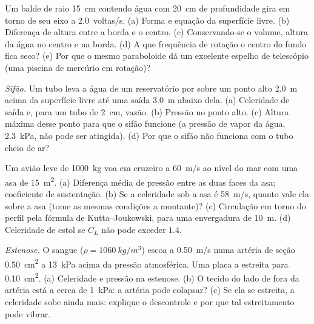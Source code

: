 \begin{exercise}[$\star\star$]\label{exo:b2:euler-bernoulli:6}
Um balde de raio \qty{15}{cm} contendo água com \qty{20}{cm} de profundidade gira
em torno de seu eixo a \qty{2.0}{voltas/s}. (a) Forma e equação da superfície
livre. (b) Diferença de altura entre a borda e o centro. (c) Conservando-se o volume,
altura da água no centro e na borda. (d) A que
frequência de rotação o centro do fundo fica seco? (e) Por que o
mesmo paraboloide dá um excelente espelho de telescópio (uma piscina de
mercúrio em rotação)?
\end{exercise}

\begin{exercise}[$\star\star$]\label{exo:b2:euler-bernoulli:7}
\emph{Sifão.} Um tubo leva a água de um reservatório por sobre um ponto alto \qty{2.0}{m}
acima da superfície livre até uma saída \qty{3.0}{m} abaixo dela. (a) Celeridade de saída
e, para um tubo de \qty{2}{cm}, vazão. (b) Pressão no ponto alto. (c)
Altura máxima desse ponto para que o sifão funcione (a pressão de vapor
da água, \qty{2.3}{kPa}, não pode ser atingida). (d) Por que o sifão
não funciona com o tubo cheio de ar?
\end{exercise}

\begin{exercise}[$\star\star$]\label{exo:b2:euler-bernoulli:8}
Um avião leve de \qty{1000}{kg} voa em cruzeiro a \qty{60}{m/s} ao nível do mar com
uma asa de \qty{15}{m^2}. (a) Diferença média de pressão entre as duas
faces da asa; coeficiente de sustentação. (b) Se a celeridade sob a asa é
\qty{58}{m/s}, quanto vale ela sobre a asa (tome as mesmas condições
a montante)? (c) Circulação em torno do perfil pela fórmula de
Kutta--Joukowski, para uma envergadura de \qty{10}{m}. (d) Celeridade de estol se
$C_L$ não pode exceder $1.4$.
\end{exercise}

\begin{exercise}[$\star\star$]\label{exo:b2:euler-bernoulli:9}
\emph{Estenose.} O sangue ($\rho = \qty{1060}{kg/m^3}$) escoa a \qty{0.50}{m/s}
numa artéria de seção \qty{0.50}{cm^2} a \qty{13}{kPa} acima da pressão
atmosférica. Uma placa a estreita para \qty{0.10}{cm^2}. (a) Celeridade e pressão
na estenose. (b) O tecido do lado de fora da artéria está a cerca de
\qty{1}{kPa}: a artéria pode colapsar? (c) Se ela se estreita, a celeridade
sobe ainda mais: explique o descontrole e por que tal estreitamento pode vibrar.
\end{exercise}

